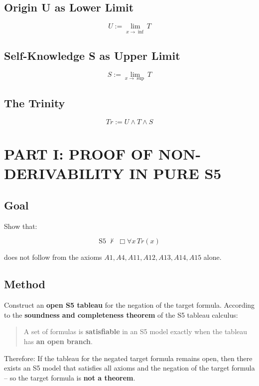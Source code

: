 \documentclass[
]{article}
\begin{document}
\subsection{Origin U as Lower Limit}

\[
\boxed{U := \lim_{x \to \inf} T}
\]

\subsection{Self-Knowledge S as Upper Limit}

\[
\boxed{S := \lim_{x \to \sup} T}
\]

\subsection{The Trinity}

\[
\boxed{Tr := U \land T \land S}
\]

\section{PART I: PROOF OF NON-DERIVABILITY IN PURE S5}

\subsection{Goal}

Show that:

\[
\boxed{\text{S5} \;\not\vdash\; \Box\forall x\,Tr(x)}
\]

does not follow from the axioms \(A1, A4, A11, A12, A13, A14, A15\) alone.

\subsection{Method}

Construct an \textbf{open S5 tableau} for the negation of the target formula.  
According to the \textbf{soundness and completeness theorem} of the S5 tableau calculus:

\begin{quote}
A set of formulas is \textbf{satisfiable} in an S5 model exactly when the tableau has \textbf{an open branch}.
\end{quote}

Therefore: If the tableau for the negated target formula remains open, then there exists an S5 model that satisfies all axioms and the negation of the target formula – so the target formula is \textbf{not a theorem}.
\end{document}
